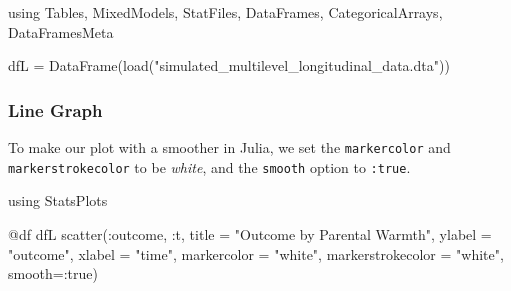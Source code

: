 \documentclass[
  letterpaper,
  DIV=11,
  numbers=noendperiod]{scrreprt}
\newenvironment{Shaded}{\begin{snugshade}}{\end{snugshade}}
\newcommand{\BuiltInTok}[1]{\textcolor[rgb]{0.00,0.23,0.31}{#1}}
\newcommand{\ConstantTok}[1]{\textcolor[rgb]{0.56,0.35,0.01}{#1}}
\newcommand{\FunctionTok}[1]{\textcolor[rgb]{0.28,0.35,0.67}{#1}}
\newcommand{\ImportTok}[1]{\textcolor[rgb]{0.00,0.46,0.62}{#1}}
\newcommand{\NormalTok}[1]{\textcolor[rgb]{0.00,0.23,0.31}{#1}}
\newcommand{\OperatorTok}[1]{\textcolor[rgb]{0.37,0.37,0.37}{#1}}
\newcommand{\PreprocessorTok}[1]{\textcolor[rgb]{0.68,0.00,0.00}{#1}}
\newcommand{\StringTok}[1]{\textcolor[rgb]{0.13,0.47,0.30}{#1}}
\begin{document}
\begin{Shaded}
\begin{Highlighting}[]
\ImportTok{using} \BuiltInTok{Tables}\NormalTok{, }\BuiltInTok{MixedModels}\NormalTok{, }\BuiltInTok{StatFiles}\NormalTok{, }\BuiltInTok{DataFrames}\NormalTok{, }\BuiltInTok{CategoricalArrays}\NormalTok{, }\BuiltInTok{DataFramesMeta}

\NormalTok{dfL }\OperatorTok{=} \FunctionTok{DataFrame}\NormalTok{(}\FunctionTok{load}\NormalTok{(}\StringTok{"simulated\_multilevel\_longitudinal\_data.dta"}\NormalTok{))}
\end{Highlighting}
\end{Shaded}

\subsubsection{Line Graph}\label{line-graph-3}

To make our plot with a smoother in Julia, we set the
\texttt{markercolor} and \texttt{markerstrokecolor} to be \emph{white},
and the \texttt{smooth} option to \texttt{:true}.

\begin{Shaded}
\begin{Highlighting}[]
\ImportTok{using} \BuiltInTok{StatsPlots}

\PreprocessorTok{@df}\NormalTok{ dfL }\FunctionTok{scatter}\NormalTok{(}\OperatorTok{:}\NormalTok{outcome, }\OperatorTok{:}\NormalTok{t, }
\NormalTok{               title }\OperatorTok{=} \StringTok{"Outcome by Parental Warmth"}\NormalTok{,}
\NormalTok{               ylabel }\OperatorTok{=} \StringTok{"outcome"}\NormalTok{,}
\NormalTok{               xlabel }\OperatorTok{=} \StringTok{"time"}\NormalTok{,}
\NormalTok{               markercolor }\OperatorTok{=} \StringTok{"white"}\NormalTok{,}
\NormalTok{               markerstrokecolor }\OperatorTok{=} \StringTok{"white"}\NormalTok{,}
\NormalTok{               smooth}\OperatorTok{=:}\ConstantTok{true}\NormalTok{)}
\end{Highlighting}
\end{Shaded}
\end{document}

